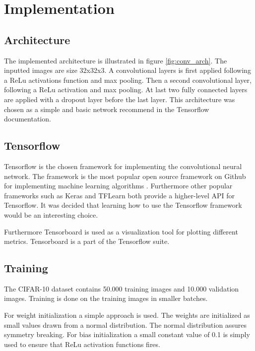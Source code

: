 \chapter{Implementation}
\label{chp:imp}

\section{Architecture}
The implemented architecture is illustrated in figure \ref{fig:conv_arch}. The inputted images are size 32x32x3. A convolutional layers is first applied following a ReLu activations function and max pooling. Then a second convolutional layer, following a ReLu activation and max pooling. At last two fully connected layers are applied with a dropout layer before the last layer. This architecture was chosen as a simple and basic network recommend in the Tensorflow documentation.


\section{Tensorflow}
Tensorflow is the chosen framework for implementing the convolutional neural network. The framework is the most popular open source framework on Github for implementing machine learning algorithms \citep{ML_frameworks}. Furthermore other popular frameworks such as Keras and TFLearn both provide a higher-level API for Tensorflow. It was decided that learning how to use the Tensorflow framework would be an interesting choice.

Furthermore Tensorboard is used as a visualization tool for plotting different metrics. Tensorboard is a part of the Tensorflow suite.

\section{Training}
The CIFAR-10 dataset contains 50.000 training images and 10.000 validation images. Training is done on the training images in smaller batches. 

For weight initialization a simple approach is used. The weights are initialized as small values drawn from a normal distribution. The normal distribution assures symmetry breaking. For bias initialization a small constant value of 0.1 is simply used to ensure that ReLu activation functions fires.

